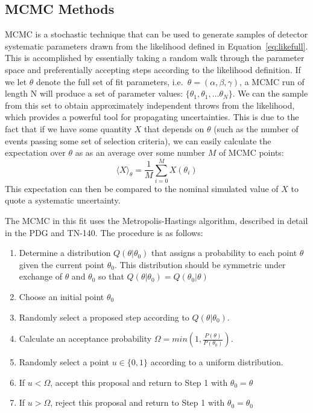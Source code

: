 \subsection{MCMC Methods}
\label{subsec:mcmc}

MCMC is a stochastic technique that can be used to generate samples of detector
systematic parameters drawn from the likelihood defined in
Equation~\ref{eq:likefull}.  This is accomplished by essentially taking a
random walk through the parameter space and preferentially accepting steps
according to the likelihood definition. If we let $\theta$ denote the full set
of fit parameters, i.e.\ $\theta = (\alpha,\beta,\gamma)$, a MCMC run of length
N will produce a set of parameter values: $\{\theta_{1}, \theta_{1}, \dots
\theta_{N}\}$.  We can the sample from this set to obtain approximately
independent throws from the likelihood, which provides a powerful tool for
propagating uncertainties.  This is due to the fact that if we have some
quantity $X$ that depends on $\theta$ (such as the number of events passing
some set of selection criteria), we can easily calculate the expectation over
$\theta$ as as an average over some number $M$ of MCMC points:
%
\begin{equation}
  \label{eq:mcmcexp}
  \langle X \rangle_{\theta} = \frac{1}{M}\sum\limits_{i=0}^{M}X(\theta_{i})
\end{equation}
%
This expectation can then be compared to the nominal simulated value of $X$ to
quote a systematic uncertainty.

The MCMC in this fit uses the Metropolis-Hastings algorithm, described
in detail in the PDG and TN-140.  The procedure is as follows:

\begin{enumerate}
  \item Determine a distribution $Q(\theta|\theta_{0})$ that assigns a
    probability to each point $\theta$ given the current point $\theta_{0}$.
    This distribution should be symmetric under exchange of $\theta$ and
    $\theta_{0}$ so that $Q(\theta|\theta_{0}) = Q(\theta_{0}|\theta) $
  \item Choose an initial point  $\theta_{0}$
  \item Randomly select a proposed step according to $Q(\theta|\theta_{0})$.
  \item Calculate an acceptance probability $\Omega = min(1,\frac{P(\theta)}{P(\theta_{0})})$.
  \item Randomly select a point $u \in \{0, 1\}$ according to a uniform distribution.
  \item If $u<\Omega$, accept this proposal and return to Step 1 with $\theta_{0} = \theta$ 
  \item If $u>\Omega$, reject this proposal and return to Step 1 with $\theta_{0} = \theta_{0}$ 
\end{enumerate}

